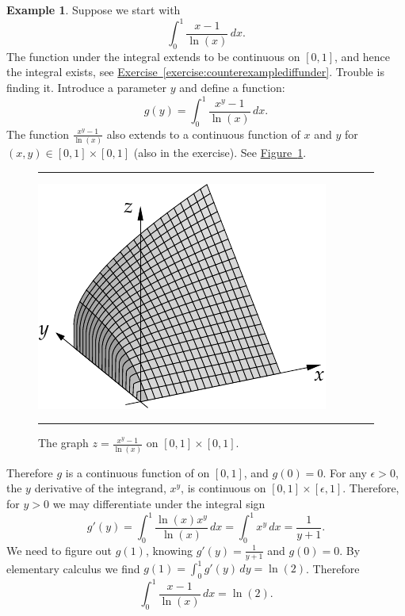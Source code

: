 \documentclass[12pt,openany]{book}
\theoremstyle{plain}
\theoremstyle{remark}
\theoremstyle{definition}
\newenvironment{myfig}{%
\begin{figure}[h!t]
\noindent\rule{\textwidth}{0.4pt}\vspace{12pt}\par\centering}%
{\par\noindent\rule{\textwidth}{0.4pt}
\end{figure}}
\theoremstyle{exercise}
\theoremstyle{example}
\newtheorem{example}[thm]{Example}
\newcommand{\figureref}[1]{\hyperref[#1]{Figure~\ref*{#1}}}
\newcommand{\exerciseref}[1]{\hyperref[#1]{Exercise~\ref*{#1}}}
\begin{document}
\begin{example} \label{example:counterexamplediffunder}
Suppose we start with
\begin{equation*}
\int_0^{1} \frac{x-1}{\ln(x)} \,dx .
\end{equation*}
The function under the integral 
extends to be continuous on $[0,1]$, and hence
the integral exists, see \exerciseref{exercise:counterexamplediffunder}.  Trouble is finding it.  Introduce a parameter $y$
and define a function:
\begin{equation*}
g(y) = \int_0^{1} \frac{x^y-1}{\ln(x)} \,dx .
\end{equation*}
The function
$\frac{x^y-1}{\ln(x)}$
also extends to a continuous function of $x$ and $y$
for $(x,y) \in [0,1] \times [0,1]$ (also in the exercise).
See \figureref{fig:diffunderexample}.
\begin{myfig}
\includegraphics{figures/diffunderexample}
\caption{The graph $z= \frac{x^y-1}{\ln(x)}$ on $[0,1] \times [0,1]$.\label{fig:diffunderexample}}
\end{myfig}


Therefore
$g$ is a continuous function of on $[0,1]$, and $g(0) = 0$.
For any $\epsilon > 0$, the $y$ derivative of the integrand, $x^y$,
is continuous on $[0,1] \times [\epsilon,1]$.  Therefore,
for $y >0$ we may differentiate under the integral sign
\begin{equation*}
g'(y) =
\int_0^{1} \frac{\ln(x) x^y}{\ln(x)} \,dx 
=
\int_0^{1} x^y \,dx =
\frac{1}{y+1} .
\end{equation*}
We need to figure out $g(1)$, knowing $g'(y) = \frac{1}{y+1}$ and $g(0) =
0$.  By elementary calculus we find $g(1) = \int_0^1 g'(y)\,dy = \ln(2)$.  Therefore
\begin{equation*}
\int_0^{1} \frac{x-1}{\ln(x)} \,dx  = \ln(2).
\end{equation*}
\end{example}
\end{document}
